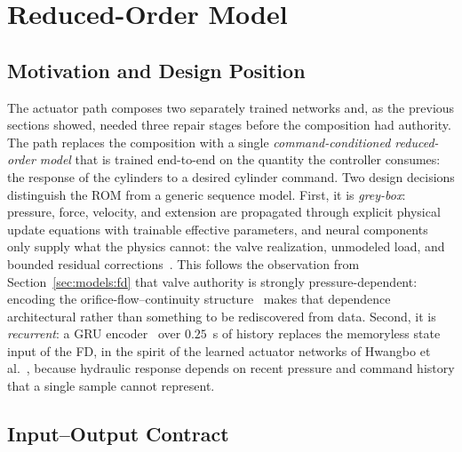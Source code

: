 \section{Reduced-Order Model}
\label{sec:models:rom}

\subsection{Motivation and Design Position}

The \ppoIDFD{} actuator path composes two separately trained networks and, as the
previous sections showed, needed three repair stages before the composition
had authority. The \ppoROM{} path replaces the composition with a single
\emph{command-conditioned reduced-order model} that is trained end-to-end on the quantity the controller consumes: the response of the cylinders
to a desired cylinder command. Two design decisions distinguish the ROM from
a generic sequence model. First, it is \emph{grey-box}: pressure, force,
velocity, and extension are propagated through explicit physical update
equations with trainable effective parameters, and neural components only supply what the physics cannot:
the valve realization, unmodeled load,
and bounded residual corrections~\cite{karniadakis2021physics,lutter2019deep}.
This follows the observation from Section~\ref{sec:models:fd} that valve
authority is strongly pressure-dependent: encoding the
orifice-flow--continuity structure~\cite{merritt1967hydraulic} makes that
dependence architectural rather than something to be rediscovered from data.
Second, it is \emph{recurrent}: a GRU encoder~\cite{cho2014learning} over
$0.25$~s of history replaces the memoryless state input of the FD, in the
spirit of the learned actuator networks of
Hwangbo et al.~\cite{hwangbo2019learning}, because hydraulic response
depends on recent pressure and command history that a single sample cannot
represent.

\subsection{Input--Output Contract}


